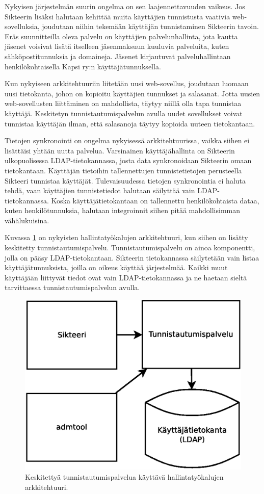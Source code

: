 Nykyisen järjestelmän suurin ongelma on sen laajennettavuuden vaikeus. Jos Sikteerin lisäksi halutaan kehittää muita käyttäjien tunnistusta vaativia web-sovelluksia, joudutaan niihin tekemään käyttäjän tunnistaminen Sikteerin tavoin. Eräs suunnitteilla oleva palvelu on käyttäjien palvelunhallinta, jota kautta jäsenet voisivat lisätä itselleen jäsenmaksuun kuuluvia palveluita, kuten sähköpostitunnuksia ja domaineja. Jäsenet kirjautuvat palveluhallintaan henkilökohtaisella Kapsi ry:n käyttäjätunnuksella.

Kun nykyiseen arkkitehtuuriin liitetään uusi web-sovellus, joudutaan luomaan uusi tietokanta, johon on kopioitu käyttäjien tunnukset ja salasanat. Jotta uusien web-sovellusten liittäminen on mahdollista, täytyy niillä olla tapa tunnistaa käyttäjä. Keskitetyn tunnistautumispalvelun avulla uudet sovellukset voivat tunnistaa käyttäjän ilman, että salasanoja täytyy kopioida uuteen tietokantaan.

Tietojen synkronointi on ongelma nykyisessä arkkitehtuurissa, vaikka siihen ei lisättäisi yhtään uutta palvelua. Varsinainen käyttäjähallinta on Sikteerin ulkopuolisessa LDAP-tie\-to\-kan\-nas\-sa, josta data synkronoidaan Sikteerin omaan tietokantaan. Käyttäjän tietoihin tallennettujen tunnistetietojen perusteella Sikteeri tunnistaa käyttäjät. Tulevaisuudessa tietojen synkronointia ei haluta tehdä, vaan käyttäjien tunnistetiedot halutaan säilyttää vain LDAP-tietokannassa. Koska käyttäjätietokantaan on tallennettu henkilökohtaista dataa, kuten henkilötunnuksia, halutaan integroinnit siihen pitää mahdollisimman vähälukuisina.

Kuvassa \ref{kapsi_nykyinen_uusi} on nykyisten hallintatyökalujen arkkitehtuuri, kun siihen on lisätty keskitetty tunnistautumispalvelu. Tunnistautumispalvelu on ainoa komponentti, jolla on pääsy LDAP-tietokantaan. Sikteerin tietokannassa säilytetään vain listaa käyttäjätunnuksista, joilla on oikeus käyttää järjestelmää. Kaikki muut käyttäjään liittyvät tiedot ovat vain LDAP-tietokannassa ja ne haetaan sieltä tarvittaessa tunnistautumispalvelun avulla.

\begin{figure}[ht]
\centering
\includegraphics[width=.7\textwidth]{toteutus/muutostarve/kapsi_uusi.eps}
\caption{Keskitettyä tunnistautumispalvelua käyttävä hallintatyökalujen arkkitehtuuri.}%
\label{kapsi_nykyinen_uusi}
\end{figure}


